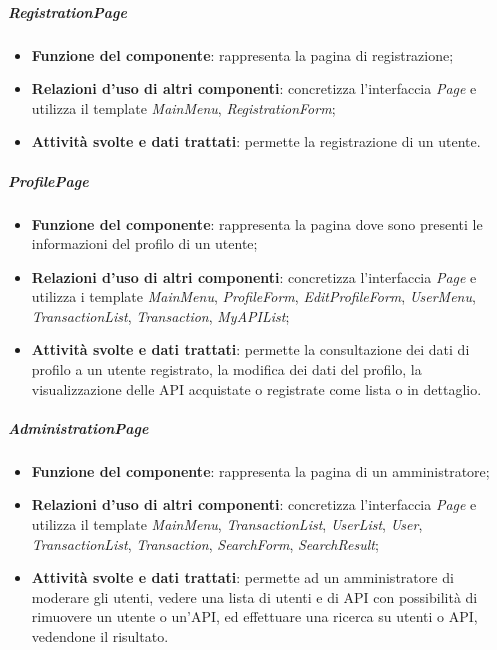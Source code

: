 \subparagraph{RegistrationPage}
\begin{itemize}
	\item \textbf{Funzione del componente}: rappresenta la pagina di registrazione;
	\item \textbf{Relazioni d’uso di altri componenti}: concretizza l'interfaccia \textit{Page} e utilizza il template \textit{MainMenu}, \textit{RegistrationForm};
	\item \textbf{Attività svolte e dati trattati}: permette la registrazione di un utente.
\end{itemize}

\subparagraph{ProfilePage}
\begin{itemize}
	\item \textbf{Funzione del componente}: rappresenta la pagina dove sono presenti le informazioni del profilo di un utente;
	\item \textbf{Relazioni d’uso di altri componenti}: concretizza l'interfaccia \textit{Page} e utilizza i template \textit{MainMenu}, \textit{ProfileForm}, \textit{EditProfileForm}, \textit{UserMenu}, \textit{TransactionList}, \textit{Transaction}, \textit{MyAPIList};
	\item \textbf{Attività svolte e dati trattati}: permette la consultazione dei dati di profilo a un utente registrato, la modifica dei dati del profilo, la visualizzazione delle API acquistate o registrate come lista o in dettaglio.
\end{itemize}

\subparagraph{AdministrationPage}
\begin{itemize}
	\item \textbf{Funzione del componente}: rappresenta la pagina di un amministratore;
	\item \textbf{Relazioni d’uso di altri componenti}: concretizza l'interfaccia \textit{Page} e utilizza il template \textit{MainMenu}, \textit{TransactionList}, \textit{UserList}, \textit{User}, \textit{TransactionList}, \textit{Transaction}, \textit{SearchForm}, \textit{SearchResult};
	\item \textbf{Attività svolte e dati trattati}: permette ad un amministratore di moderare gli utenti, vedere una lista di utenti e di API con possibilità di rimuovere un utente o un'API, ed effettuare una ricerca su utenti o API, vedendone il risultato.
\end{itemize}

